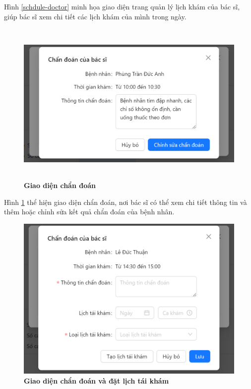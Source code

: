 Hình \ref{schdule-doctor} minh họa giao diện trang quản lý lịch khám của bác sĩ, giúp bác sĩ xem chi tiết các lịch khám của mình trong ngày.

\begin{figure}[H]
	\centering
	\includegraphics[width=15cm,height=8cm]{Images/doctor_ui/diag.png}
	\caption[Giao diện chẩn đoán]{\bfseries \fontsize{12pt}{0pt}\selectfont Giao diện chẩn đoán}
	\label{diag}
\end{figure}

Hình \ref{diag} thể hiện giao diện chẩn đoán, nơi bác sĩ có thể xem chi tiết thông tin và thêm hoặc chỉnh sửa kết quả chẩn đoán của bệnh nhân.

\begin{figure}[H]
	\centering
	\includegraphics[width=12cm]{Images/doctor_ui/diag_reschedule.png}
	\caption[Giao diện chẩn đoán và đặt lịch tái khám]{\bfseries \fontsize{12pt}{0pt}\selectfont Giao diện chẩn đoán và đặt lịch tái khám}
	\label{diag_reschedule}
\end{figure}

